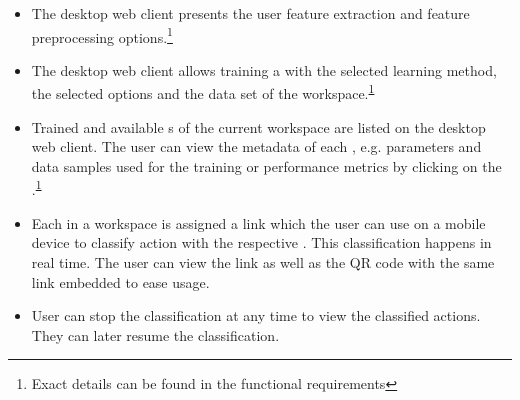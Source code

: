 \begin{itemize}
    \item The desktop web client presents the user \gls{feature extraction} and feature preprocessing options.\footnote{\label{exact}Exact details can be found in the functional requirements}
    \item The desktop web client allows training a  with the selected learning method, the selected options and the data set of the \gls{workspace}.\textsuperscript{\ref{exact}}
    \item Trained and available s of the current \gls{workspace} are listed on the desktop web client. The user can view the \gls{metadata} of each , e.g. parameters and \glspl{data sample} used for the training or performance metrics by clicking on the .\textsuperscript{\ref{exact}}
    \item Each  in a \gls{workspace} is assigned a link which the user can use on a mobile device to classify action with the respective . This \gls{classification} happens in real time. The user can view the link as well as the \gls{QR code} with the same link embedded to ease usage. 
    \item User can stop the \gls{classification} at any time to view the classified actions. They can later resume the \gls{classification}.   
\end{itemize}

